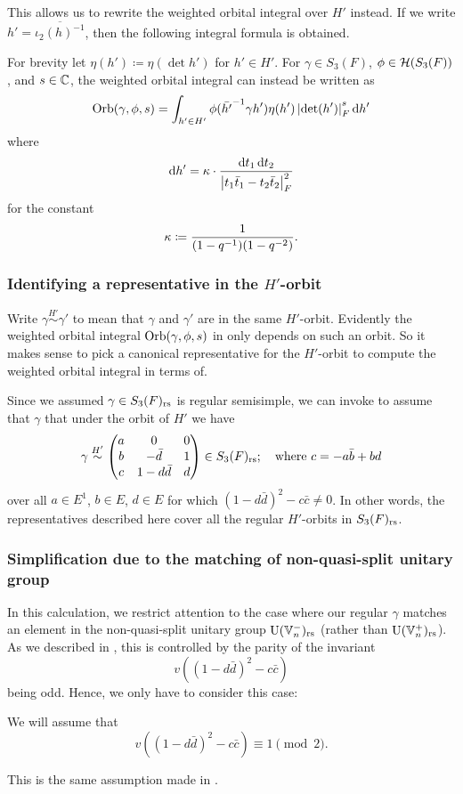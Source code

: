 This allows us to rewrite the weighted orbital integral over $H'$ instead.
If we write $h' = \overline{\iota_2(h)^{-1}}$,
then the following integral formula is obtained.
\begin{proposition}
  \label{prop:orbital_over_H_prime}
  For brevity let $\eta(h') \coloneqq \eta(\det h')$ for $h' \in H'$.
  For $\gamma \in S_3(F)$, $\phi \in \mathcal H(S_3(F))$, and $s \in \mathbb C$,
  the weighted orbital integral can instead be written as
  \[ \Orb(\gamma, \phi, s) =
    \int_{h' \in H'} \phi(\bar{h'}\inv \gamma h') \eta(h')
    \left\lvert \det(h') \right\rvert_F^{s} \odif{h'} \]
  where
  \[ \odif{h'} = \kappa \cdot \frac{\odif t_1 \odif t_2}
    {\left\lvert t_1 \bar t_1 - t_2 \bar t_2 \right\rvert_F^2} \]
  for the constant
  \[ \kappa \coloneqq \frac{1}{(1-q^{-1})(1-q^{-2})}. \]
\end{proposition}

\subsubsection{Identifying a representative in the $H'$-orbit}
Write $\gamma \overset{H'}{\sim} \gamma'$ to mean that $\gamma$ and $\gamma'$
are in the same $H'$-orbit.
Evidently the weighted orbital integral $\operatorname{Orb}(\gamma, \phi, s)$ in 
only depends on such an orbit.
So it makes sense to pick a canonical representative for the $H'$-orbit to compute
the weighted orbital integral in terms of.

Since we assumed $\gamma \in S_3(F)_{\mathrm{rs}}$ is regular semisimple,
we can invoke \cite[Proposition 4.1]{ref:AFL}
to assume that $\gamma$ that under the orbit of $H'$ we have
\[ \gamma \overset{H'}{\sim}
  \begin{pmatrix}
    a & 0 & 0 \\
    b & - \bar d & 1 \\
    c & 1 - d \bar d & d
  \end{pmatrix}
  \in S_3(F)_{\mathrm{rs}}; \quad \text{where $c = -a \bar b + b d$} \]
over all $a \in E^1$, $b \in E$, $d \in E$ for which $(1-d\bar d)^2 - c \bar c \neq 0$.
In other words, the representatives described here cover all the regular $H'$-orbits in $S_3(F)_{\mathrm{rs}}$.

\subsubsection{Simplification due to the matching of non-quasi-split unitary group}
In this calculation, we restrict attention to the case where our regular $\gamma$
matches an element in the non-quasi-split unitary group $\operatorname{U}(\mathbb V_n^-)_{\mathrm{rs}}$
(rather than $\operatorname{U}(\mathbb V_n^+)_{\mathrm{rs}}$).
As we described in ,
this is controlled by the parity of the invariant
\[ v\left( (1-d\bar d)^2 - c \bar c\right) \]
being odd.
Hence, we only have to consider this case:
\begin{assume}
  \label{assume:u_odd}
  We will assume that
  \[ v\left( (1-d\bar d)^2 - c \bar c\right) \equiv 1 \pmod 2. \]
\end{assume}
This is the same assumption made in \cite[Equation (4.3)]{ref:AFL}.


